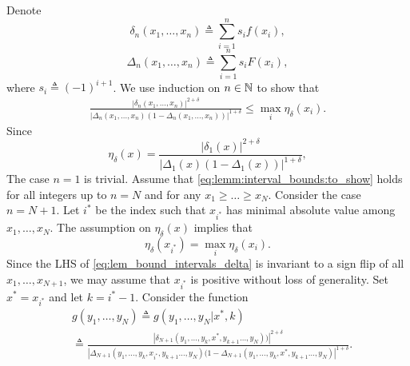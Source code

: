 \begin{proof-of-lemma}[\ref{lem:bound_intervals_delta}]
  Denote 
  \begin{equation*}
    \delta_n(x_1,\ldots,x_n) \triangleq \sum_{i=1}^{n} s_i f(x_i),
  \end{equation*}
  \begin{equation*}
    \Delta_n(x_1,\ldots,x_n) \triangleq  \sum_{i=1}^n s_i F(x_i), 
  \end{equation*}
  where $s_i \triangleq (-1)^{i+1}$. We use induction on $n \in \mathbb{N}$ to show that 
  \begin{align}
    \label{eq:lemm:interval_bounds:to_show}
    \frac{ \left| \delta_n(x_1,\ldots,x_n) \right|^{2+\delta}} 
         {\left|\Delta_n(x_1,\ldots,x_n)\left(1- \Delta_n(x_1,\ldots,x_n) \right) \right|^{1+\delta} } \leq \max_{i}\eta_{\delta}(x_i).
  \end{align}
  Since 
  \begin{equation*}
    \eta_\delta(x) =  \frac{  \left|\delta_1(x) \right|^{2+\delta}}{\left|\Delta_1(x)
      (1-\Delta_1(x)) \right|^{1+\delta}}, 
  \end{equation*}
  The case $n=1$ is trivial.  
  Assume that \eqref{eq:lemm:interval_bounds:to_show} holds for all integers up to $n = N$ and for any $x_1 \ge \ldots \ge x_N$. Consider the case $n = N+1$. Let $i^*$ be the index such that $x_{i^*}$ has minimal absolute value among $x_1,\ldots,x_N$. The assumption on $\eta_\delta(x)$ implies that
  \begin{equation*}
    \eta_\delta(x_{i^*}) = \max_i \eta_\delta(x_i).
  \end{equation*}
  Since the LHS of \eqref{eq:lem_bound_intervals_delta} is invariant to a sign flip of all $x_1,\ldots,x_{N+1}$, we may assume that $x_{i^*}$ is positive without loss of generality. 
  Set $x^* = x_{i^*}$ and let $k=i^*-1$. Consider the function
  \begin{align}
    & g(y_1,\ldots,y_N) \triangleq g(y_1,\ldots,y_N|x^*,k) \\
    &  \triangleq  \frac{\left| \delta_{N+1}(y_1,\ldots,y_k,x^*,y_{k+1}\ldots,y_N) )\right|^{2+\delta}}{
      \left|\Delta_{N+1}(y_1,\ldots,y_k,x_{i^*},y_{k+1}\ldots,y_N)  (1 -\Delta_{N+1}(y_1,\ldots,y_k,x^*,y_{k+1}\ldots,y_N)  \right|^{1+\delta}
    } \label{eq:g_def}.
  \end{align}

\end{proof-of-lemma}
